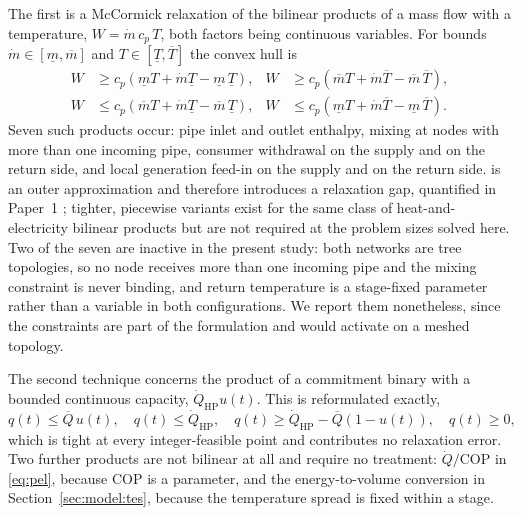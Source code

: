 \documentclass[review,3p]{elsarticle}
\newcommand{\COP}{\mathrm{COP}}
\newcommand{\QWP}{\dot{Q}_{\mathrm{HP}}}
\begin{document}
The first is a McCormick relaxation \cite{McCormick.1976,Castro.2015} of the bilinear
products of a mass flow with a temperature, $W = \dot{m}\, c_p\, T$,
both factors being continuous variables. For bounds
$\dot{m} \in [\underline{m}, \overline{m}]$ and
$T \in [\underline{T}, \overline{T}]$ the convex hull is
\begin{equation}
\label{eq:mccormick}
\begin{aligned}
W &\ge c_p\left(\underline{m} T + \dot{m}\underline{T} - \underline{m}\,\underline{T}\right), &
W &\ge c_p\left(\overline{m} T + \dot{m}\overline{T} - \overline{m}\,\overline{T}\right), \\
W &\le c_p\left(\overline{m} T + \dot{m}\underline{T} - \overline{m}\,\underline{T}\right), &
W &\le c_p\left(\underline{m} T + \dot{m}\overline{T} - \underline{m}\,\overline{T}\right).
\end{aligned}
\end{equation}
Seven such products occur: pipe inlet and outlet enthalpy, mixing at
nodes with more than one incoming pipe, consumer withdrawal on the
supply and on the return side, and local generation feed-in on the
supply and on the return side.  is an outer
approximation and therefore introduces a relaxation gap, quantified in
Paper~1 \cite{Ruess.2026}; tighter, piecewise variants exist for the
same class of heat-and-electricity bilinear products
\cite{Deng.2021,Castro.2015} but are not required at the problem sizes
solved here. Two of the seven are inactive in the present
study: both networks are tree topologies, so no node receives more than
one incoming pipe and the mixing constraint is never binding, and return
temperature is a stage-fixed parameter rather than a variable in both
configurations. We report them nonetheless, since the constraints are
part of the formulation and would activate on a meshed topology.

The second technique concerns the product of a commitment binary with a
bounded continuous capacity, $\QWP u(t)$. This is reformulated exactly,
\begin{equation}
\label{eq:bigm}
q(t) \le \overline{Q}\, u(t), \quad
q(t) \le \QWP, \quad
q(t) \ge \QWP - \overline{Q}\left(1 - u(t)\right), \quad
q(t) \ge 0,
\end{equation}
which is tight at every integer-feasible point and contributes no
relaxation error. Two further products are not bilinear at all and
require no treatment: $\dot{Q}/\COP$ in \cref{eq:pel}, because $\COP$ is
a parameter, and the energy-to-volume conversion in
Section~\ref{sec:model:tes}, because the temperature spread is fixed
within a stage.
\end{document}

